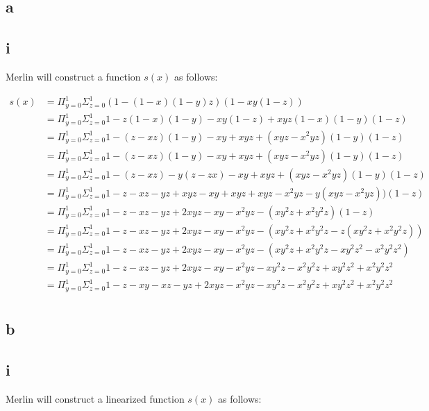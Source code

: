 \documentclass[letterpaper,notitlepage,twoside]{article}
\begin{document}
\subsection*{a}
\subsection*{i}
Merlin will construct a function $s(x)$ as follows:

\begin{align*}
s(x) &= \Pi_{y = 0}^1\Sigma_{z = 0}^1 (1 - (1 - x)(1 - y)z)(1 - xy(1 - z)) \\
     &= \Pi_{y = 0}^1\Sigma_{z = 0}^1 1 - z(1 - x)(1 - y) - xy(1 - z) + xyz(1 - x)(1 - y)(1 - z) \\
     &= \Pi_{y = 0}^1\Sigma_{z = 0}^1 1 - (z - xz)(1 - y) - xy + xyz + (xyz - x^2yz)(1 - y)(1 - z) \\
     &= \Pi_{y = 0}^1\Sigma_{z = 0}^1 1 - (z - xz)(1 - y) - xy + xyz + (xyz - x^2yz)(1 - y)(1 - z) \\
     &= \Pi_{y = 0}^1\Sigma_{z = 0}^1 1 - (z - xz) - y(z - zx) - xy + xyz + (xyz - x^2yz)(1 - y)(1 - z) \\
     &= \Pi_{y = 0}^1\Sigma_{z = 0}^1 1 - z - xz - yz + xyz - xy + xyz + xyz - x^2yz - y(xyz - x^2yz))(1 - z) \\
     &= \Pi_{y = 0}^1\Sigma_{z = 0}^1 1 - z - xz - yz + 2xyz - xy - x^2yz - (xy^2z + x^2y^2z)(1 - z) \\
     &= \Pi_{y = 0}^1\Sigma_{z = 0}^1 1 - z - xz - yz + 2xyz - xy - x^2yz - (xy^2z + x^2y^2z - z(xy^2z + x^2y^2z)) \\
     &= \Pi_{y = 0}^1\Sigma_{z = 0}^1 1 - z - xz - yz + 2xyz - xy - x^2yz - (xy^2z + x^2y^2z - xy^2z^2 - x^2y^2z^2) \\
     &= \Pi_{y = 0}^1\Sigma_{z = 0}^1 1 - z - xz - yz + 2xyz - xy - x^2yz - xy^2z - x^2y^2z + xy^2z^2 + x^2y^2z^2 \\
     &= \Pi_{y = 0}^1\Sigma_{z = 0}^1 1 - z - xy - xz - yz + 2xyz - x^2yz - xy^2z - x^2y^2z + xy^2z^2 + x^2y^2z^2 \\
\end{align*}

\subsection*{b}
\subsection*{i}
Merlin will construct a linearized function $s(x)$ as follows:
\end{document}
